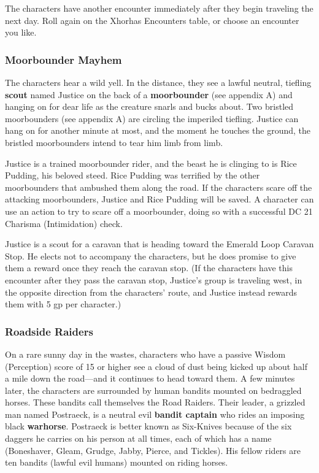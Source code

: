 \documentclass[10pt,a4paper,twoside,fancy,bg=print,twocolumn,openany,nodeprecatedcode]{dndbook}
\begin{document}
The characters have another encounter immediately after they begin traveling the next day. Roll again on the Xhorhas Encounters table, or choose an encounter you like.

\subsubsection{Moorbounder Mayhem}
The characters hear a wild yell. In the distance, they see a lawful neutral, tiefling \textbf{scout} named Justice on the back of a \textbf{moorbounder} (see appendix A) and hanging on for dear life as the creature snarls and bucks about. Two bristled moorbounders (see appendix A) are circling the imperiled tiefling. Justice can hang on for another minute at most, and the moment he touches the ground, the bristled moorbounders intend to tear him limb from limb.

Justice is a trained moorbounder rider, and the beast he is clinging to is Rice Pudding, his beloved steed. Rice Pudding was terrified by the other moorbounders that ambushed them along the road. If the characters scare off the attacking moorbounders, Justice and Rice Pudding will be saved. A character can use an action to try to scare off a moorbounder, doing so with a successful DC 21 Charisma (Intimidation) check.

Justice is a scout for a caravan that is heading toward the Emerald Loop Caravan Stop. He elects not to accompany the characters, but he does promise to give them a reward once they reach the caravan stop. (If the characters have this encounter after they pass the caravan stop, Justice's group is traveling west, in the opposite direction from the characters' route, and Justice instead rewards them with 5 gp per character.)

\subsubsection{Roadside Raiders}
On a rare sunny day in the wastes, characters who have a passive Wisdom (Perception) score of 15 or higher see a cloud of dust being kicked up about half a mile down the road—and it continues to head toward them. A few minutes later, the characters are surrounded by human bandits mounted on bedraggled horses. These bandits call themselves the Road Raiders. Their leader, a grizzled man named Postraeck, is a neutral evil \textbf{bandit captain} who rides an imposing black \textbf{warhorse}. Postraeck is better known as Six-Knives because of the six daggers he carries on his person at all times, each of which has a name (Boneshaver, Gleam, Grudge, Jabby, Pierce, and Tickles). His fellow riders are ten bandits (lawful evil humans) mounted on riding horses.
\end{document}
